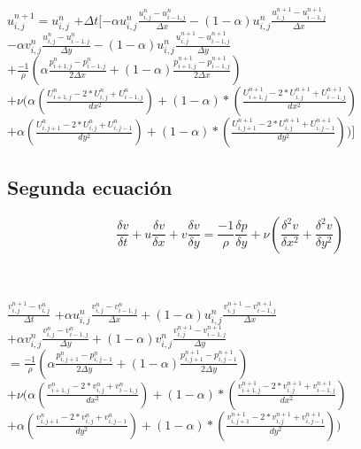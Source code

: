 \documentclass[a4paper]{article}
\begin{document}
$  {u}^{n+1}_{i,j} = u^{n}_{i,j}  $
$+ \Delta t [- \alpha {u}^{n}_{i,j} \frac{ {u}^{n}_{i,j} - u^{n}_{i-1,j}}{ \Delta x} - (1 - \alpha) {u}^{n}_{i,j} \frac{ {u}^{n+1}_{i,j} - u^{n+1}_{i-1,j}}{ \Delta x}$ 
\\
$- \alpha {v}^{n}_{i,j} \frac{ {u}^{n}_{i,j} - u^{n}_{i-1,j}}{ \Delta y} - (1 - \alpha) {u}^{n}_{i,j} \frac{ {u}^{n+1}_{i,j} - u^{n+1}_{i-1,j}}{ \Delta y}$
\\
$+ \frac{-1}{\rho} ( \alpha \frac{p^{n}_{i+1,j} - p^{n}_{i-1,j} }{ 2 \Delta x } + (1 - \alpha) \frac{p^{n+1}_{i+1,j} - p^{n+1}_{i-1,j} }{ 2 \Delta x })  $
\\
$+ \nu (\alpha (\frac{ U^{n}_{i+1,j} - 2*U^{n}_{i,j} + U^{n}_{i-1,j}}{dx^2}) + (1-\alpha)*(\frac{ U^{n+1}_{i+1,j} - 2*U^{n+1}_{i,j} + U^{n+1}_{i-1,j}}{dx^2})$
\\
$+ \alpha (\frac{ U^{n}_{i,j+1} - 2*U^{n}_{i,j} + U^{n}_{i,j-1}}{dy^2}) + (1-\alpha)*(\frac{ U^{n+1}_{i,j+1} - 2*U^{n+1}_{i,j} + U^{n+1}_{i,j-1}}{dy^2})) ]$


\subsection{Segunda ecuación}



$$ \frac{\delta v}{\delta t} + u \frac{\delta v}{\delta x} + v \frac{\delta v}{\delta y} =  \frac{-1}{\rho} \frac{\delta p}{\delta y} + \nu (\frac{{\delta}^{2} v}{\delta {x}^{2}} + \frac{{\delta}^{2} v}{\delta {y}^{2}}) $$

~\\
~\\

$ \frac{ {v}^{n+1}_{i,j} - v^{n}_{i,j}}{ \Delta t} $
$+ \alpha {u}^{n}_{i,j} \frac{ {v}^{n}_{i,j} - v^{n}_{i-1,j}}{ \Delta x} + (1 - \alpha) {u}^{n}_{i,j} \frac{ {v}^{n+1}_{i,j} - v^{n+1}_{i-1,j}}{ \Delta x}$ 
\\
$+ \alpha {v}^{n}_{i,j} \frac{ {v}^{n}_{i,j} - v^{n}_{i-1,j}}{ \Delta y} + (1 - \alpha) {v}^{n}_{i,j} \frac{ {v}^{n+1}_{i,j} - v^{n+1}_{i-1,j}}{ \Delta y}$
\\
$= \frac{-1}{\rho} ( \alpha \frac{p^{n}_{i,j+1} - p^{n}_{i,j-1} }{ 2 \Delta y } + (1 - \alpha) \frac{p^{n+1}_{i,j+1} - p^{n+1}_{i,j-1} }{ 2 \Delta y })  $
\\
$+ \nu (\alpha (\frac{ v^{n}_{i+1,j} - 2*v^{n}_{i,j} + v^{n}_{i-1,j}}{dx^2}) + (1-\alpha)*(\frac{ v^{n+1}_{i+1,j} - 2*v^{n+1}_{i,j} + v^{n+1}_{i-1,j}}{dx^2})$
\\
$+ \alpha (\frac{ v^{n}_{i,j+1} - 2*v^{n}_{i,j} + v^{n}_{i,j-1}}{dy^2}) + (1-\alpha)*(\frac{ v^{n+1}_{i,j+1} - 2*v^{n+1}_{i,j} + v^{n+1}_{i,j-1}}{dy^2}))$
\end{document}
